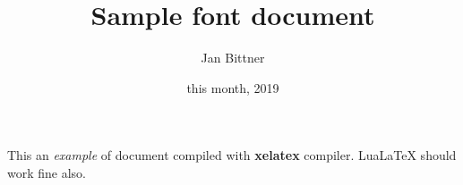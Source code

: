 \documentclass[12pt]{article}
\title{Sample font document}
\author{Jan Bittner}
\date{this month, 2019}
\begin{document}
 
 \maketitle
 
 This an \textit{example} of document compiled 
 with \textbf{xelatex} compiler. LuaLaTeX should 
 work fine also.
 
\end{document}
